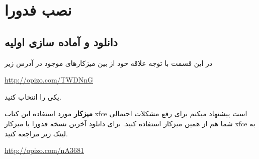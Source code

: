 \chapter{نصب فدورا}\label{ch-2}
\section{دانلود و آماده سازی اولیه}\label{se-21}
در این قسمت با توجه علاقه خود از بین میزکارهای موجود در آدرس زیر 
\begin{flushleft}
\href{https://spins.fedoraproject.org/}{http://opizo.com/TWDNnG}
\end{flushleft}
یکی را انتخاب کنید.
\begin{tcolorbox}[title=انتخاب میزکار]
	\textbf{میزکار}
	مورد استفاده این کتاب  xfce است پیشنهاد میکنم برای رفع مشکلات احتمالی شما هم از همین میزکار استفاده کنید. برای دانلود آخرین نسخه فدورا با میزکار xfce به لینک زیر مراجعه کنید.
	\begin{flushleft}
		\href{https://spins.fedoraproject.org/xfce/download/index.html}{http://opizo.com/nA3681}
	\end{flushleft}
\end{tcolorbox}
